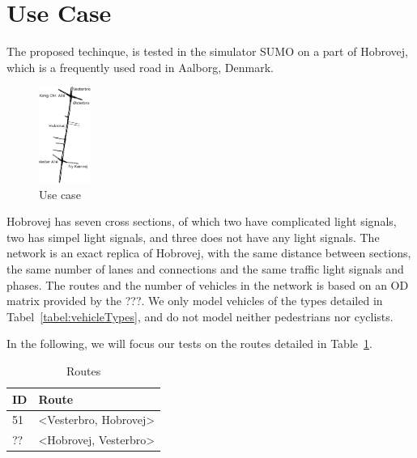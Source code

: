 \section{Use Case}
The proposed techinque, \tech is tested in the simulator SUMO on a part of Hobrovej, which is a frequently used road in Aalborg, Denmark.

\begin{figure}[htb]
\centering
\includegraphics[width=0.15\textwidth]{images/Hobrovej.png}
\caption{Use case}
\label{fig:Introduction:hobro}
\end{figure}

Hobrovej has seven cross sections, of which two have complicated light signals, two has simpel light signals, and three does not have any light signals. %
The network is an exact replica of Hobrovej, with the same distance between sections, the same number of lanes and connections and the same traffic light signals and phases.
The routes and the number of vehicles in the network is based on an OD matrix provided by the ???.
We only model vehicles of the types detailed in Tabel~\ref{tabel:vehicleTypes}, and do not model neither pedestrians nor cyclists.

In the following, we will focus our tests on the routes detailed in Table~\ref{tb:useCase:routes}.
\begin{table} %
\centering
\begin{tabular}{|l|l|}\hline
\textbf{ID} & \textbf{Route}\\\hline
51 & <Vesterbro, Hobrovej>\\\hline
?? & <Hobrovej, Vesterbro>\\\hline
\end{tabular}
\caption{Routes}\label{tb:useCase:routes}
\end{table}